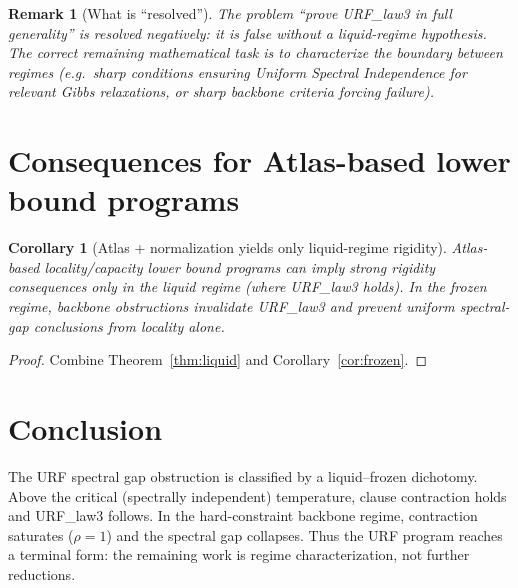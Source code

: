 \documentclass[11pt]{article}
\newtheorem{corollary}{Corollary}
\newtheorem{remark}{Remark}
\begin{document}
\begin{remark}[What is ``resolved'']
The problem ``prove URF\_law3 in full generality'' is resolved negatively: it is false without a liquid-regime hypothesis.
The correct remaining mathematical task is to characterize the boundary between regimes (e.g.\ sharp conditions ensuring
Uniform Spectral Independence for relevant Gibbs relaxations, or sharp backbone criteria forcing failure).
\end{remark}

\section{Consequences for Atlas-based lower bound programs}

\begin{corollary}[Atlas + normalization yields only liquid-regime rigidity]\label{cor:conseq}
Atlas-based locality/capacity lower bound programs can imply strong rigidity consequences only in the liquid regime
(where URF\_law3 holds). In the frozen regime, backbone obstructions invalidate URF\_law3 and prevent uniform spectral-gap
conclusions from locality alone.
\end{corollary}

\begin{proof}
Combine Theorem~\ref{thm:liquid} and Corollary~\ref{cor:frozen}.
\end{proof}

\section*{Conclusion}
The URF spectral gap obstruction is classified by a liquid--frozen dichotomy.
Above the critical (spectrally independent) temperature, clause contraction holds and URF\_law3 follows.
In the hard-constraint backbone regime, contraction saturates ($\rho=1$) and the spectral gap collapses.
Thus the URF program reaches a terminal form: the remaining work is regime characterization, not further reductions.
\end{document}
